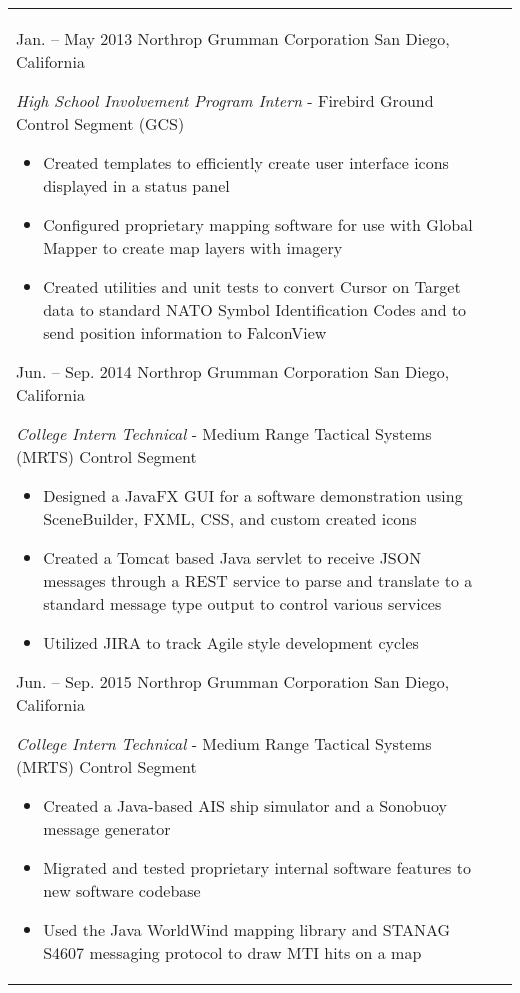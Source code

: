 \documentclass[print]{friggeri-cv} %
\makeatletter
\renewenvironment{entrylist}{%
\par\begin{tabular*}{\textwidth}{@{\extracolsep{\fill}}ll}
}{%
\end{tabular*}\par
}
\makeatother
\begin{document}
\begin{entrylist}
\entry
{Jan. -- May 2013}
{Northrop Grumman Corporation}
{San Diego, California}
{\emph{High School Involvement Program Intern} - Firebird Ground Control Segment (GCS)
\begin{itemize}
\item Created templates to efficiently create user interface icons displayed in a status panel
\item Configured proprietary mapping software for use with Global Mapper to create map layers with imagery
\item Created utilities and unit tests to convert Cursor on Target data to standard NATO Symbol Identification Codes and to send position information to FalconView
\end{itemize}}
\entry
{Jun. -- Sep. 2014}
{Northrop Grumman Corporation}
{San Diego, California}
{\emph{College Intern Technical} - Medium Range Tactical Systems (MRTS) Control Segment
\begin{itemize}
\item Designed a JavaFX GUI for a software demonstration using SceneBuilder, FXML, CSS, and custom created icons
\item Created a Tomcat based Java servlet to receive JSON messages through a REST service to parse and translate to a standard message type output to control various services
\item Utilized JIRA to track Agile style development cycles
\end{itemize}}
\entry
{Jun. -- Sep. 2015}
{Northrop Grumman Corporation}
{San Diego, California}
{\emph{College Intern Technical} - Medium Range Tactical Systems (MRTS) Control Segment
\begin{itemize}
\item Created a Java-based AIS ship simulator and a Sonobuoy message generator
\item Migrated and tested proprietary internal software features to new software codebase
\item Used the Java WorldWind mapping library and STANAG S4607 messaging protocol to draw MTI hits on a map
\end{itemize}}
\end{entrylist}

\end{document}
